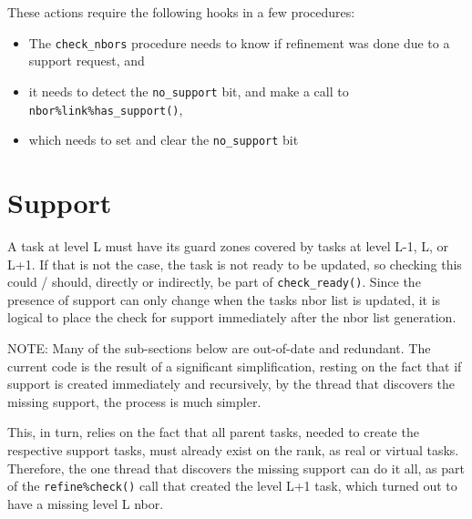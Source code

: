 \documentclass[paper=a4,fontsize=11pt]{scrartcl}
\numberwithin{equation}{section}		%
\numberwithin{figure}{section}			%
\numberwithin{table}{section}				%
\newcommand{\codecolor}{\color{Blue}}
\newcommand{\Code}[1]{{\codecolor\texttt{#1}}}
\def\checkready{\Code{check\_ready()}}
\begin{document}
These actions require the following hooks in a few procedures:
\begin{itemize}
    \item The \Code{check\_nbors} procedure needs to know if refinement was done due to a support request, and 
    \item it needs to detect the \Code{no\_support} bit, and make a call to \Code{nbor\%link\%has\_support()}, 
    \item which needs to set and clear the \Code{no\_support} bit
\end{itemize}

\section{Support}
A task at level L must have its guard zones covered by tasks at level L-1, L, or L+1.  If that is not the case, the task is not ready to be updated, so checking this could / should, directly or indirectly, be part of \checkready.  Since the presence of support can only change when the tasks nbor list is updated, it is logical to place the check for support immediately after the nbor list generation.

NOTE:  Many of the sub-sections below are out-of-date and redundant.  The current code is the result of a significant simplification, resting on the fact that if support is created immediately and recursively, by the thread that discovers the missing support, the process is much simpler.

This, in turn, relies on the fact that all parent tasks, needed to create the respective support tasks, must already exist on the rank, as real or virtual tasks.  Therefore, the one thread that discovers the missing support can do it all, as part of the \verb|refine%check()| call that created the level L+1 task, which turned out to have a missing level L nbor.
\end{document}
